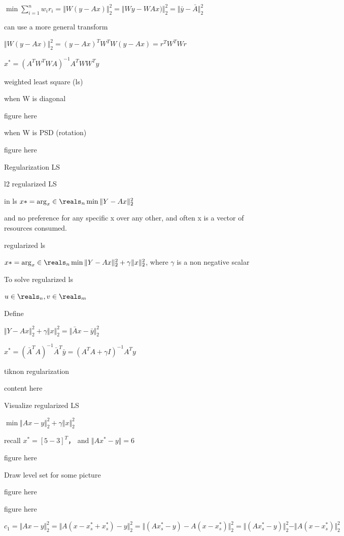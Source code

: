 $\min \sum_{i=1}^{n} w_i r_i=\Vert W (y-Ax)\Vert ^2_2=\Vert Wy-WAx)\Vert ^2_2=\Vert \bar{y}-\bar{A} \Vert ^2_2$

can use a more general transform 

$\Vert W (y-Ax)\Vert ^2_2 = (y-Ax)^TW^TW(y-Ax)=r^TW^TWr$

$x^*=(A^TW^TWA)^{-1}A^TWW^Ty$




weighted least square (ls) 

when W is diagonal 

figure here

when W is PSD (rotation)

figure here




Regularization LS

l2 regularized LS

in ls $x*=\arg_x\in\reals_{n} \min \Vert Y-Ax\Vert ^2_2$

and no preference for any specific x over any other, and often x is a vector of resources consumed.

regularized ls

$x*=\arg_x\in\reals_{n} \min \Vert Y-Ax\Vert ^2_2 + \gamma \Vert x\Vert ^2_2$, where $\gamma$ is a non negative scalar


To solve regularized ls

$u\in\reals_{n}, v\in\reals_{m}$


Define


$\Vert Y-Ax\Vert ^2_2 + \gamma \Vert x\Vert ^2_2=\Vert \bar{A}x-\bar{y}\Vert^2_2$

$x^*=(\bar{A}^TA)^{-1}\bar{A}^T\bar{y}=(A^TA+\gamma I)^{-1}A^Ty$


tiknon regularization

content here


Visualize regularized LS

$\min \Vert Ax-y\Vert_2^2 +\gamma\Vert x\Vert^2_2$

recall $x^*=[5 -3]^T$， and $\Vert Ax^*-y\Vert = 6$

figure here


Draw level set for some picture

figure here

figure here



$c_1=\Vert Ax-y\Vert^2_2=\Vert A(x-x_s^*+x_s^*)-y\Vert^2_2=\Vert (Ax_s^*-y)-A(x-x_s^*)\Vert^2_2=\Vert (Ax_s^*-y)\Vert^2_2 - \Vert A(x-x_s^*)\Vert^2_2$

